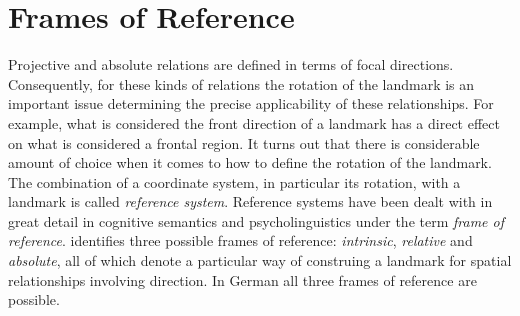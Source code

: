 \section{Frames of Reference}
Projective and absolute relations are defined in terms of focal directions.
Consequently, for these kinds of relations the rotation of the landmark 
is an important issue determining the precise applicability of 
these relationships. For example, what is considered the front direction 
of a landmark has a direct effect on what is considered a frontal region. It turns out
that there is considerable amount of choice when it comes to how to
define the rotation of the landmark. The combination 
of a coordinate system, in particular its rotation, with a landmark is 
called \emph{reference system}. Reference systems 
have been dealt with in great detail in cognitive semantics and 
psycholinguistics under the term \emph{frame of reference}. 
\cite{levinson1996language,levinson2003space} identifies 
three possible frames of reference: \emph{intrinsic}, \emph{relative} 
and \emph{absolute}, all of which denote a particular way of construing 
a landmark for spatial relationships involving direction. 
In German all three frames of reference are possible.


